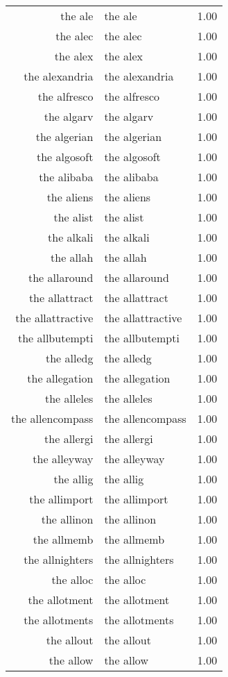 \begin{table}[ht]
\begin{tabular}{rlr}
  the ale & the ale & 1.00 \\ 
  the alec & the alec & 1.00 \\ 
  the alex & the alex & 1.00 \\ 
  the alexandria & the alexandria & 1.00 \\ 
  the alfresco & the alfresco & 1.00 \\ 
  the algarv & the algarv & 1.00 \\ 
  the algerian & the algerian & 1.00 \\ 
  the algosoft & the algosoft & 1.00 \\ 
  the alibaba & the alibaba & 1.00 \\ 
  the aliens & the aliens & 1.00 \\ 
  the alist & the alist & 1.00 \\ 
  the alkali & the alkali & 1.00 \\ 
  the allah & the allah & 1.00 \\ 
  the allaround & the allaround & 1.00 \\ 
  the allattract & the allattract & 1.00 \\ 
  the allattractive & the allattractive & 1.00 \\ 
  the allbutempti & the allbutempti & 1.00 \\ 
  the alledg & the alledg & 1.00 \\ 
  the allegation & the allegation & 1.00 \\ 
  the alleles & the alleles & 1.00 \\ 
  the allencompass & the allencompass & 1.00 \\ 
  the allergi & the allergi & 1.00 \\ 
  the alleyway & the alleyway & 1.00 \\ 
  the allig & the allig & 1.00 \\ 
  the allimport & the allimport & 1.00 \\ 
  the allinon & the allinon & 1.00 \\ 
  the allmemb & the allmemb & 1.00 \\ 
  the allnighters & the allnighters & 1.00 \\ 
  the alloc & the alloc & 1.00 \\ 
  the allotment & the allotment & 1.00 \\ 
  the allotments & the allotments & 1.00 \\ 
  the allout & the allout & 1.00 \\ 
  the allow & the allow & 1.00 \\ 

\end{tabular}
\end{table}
